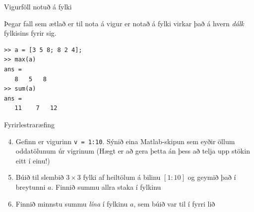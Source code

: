 \documentclass[handout]{beamer}
\begin{document}
\begin{frame}[fragile]{Vigurföll notuð á fylki}

Þegar fall sem ætlað er til nota á vigur er notað á fylki virkar það á hvern \emph{dálk} fylkisins fyrir sig.

\begin{verbatim}
>> a = [3 5 8; 8 2 4];
>> max(a)
ans =
   8   5   8
>> sum(a)
ans =
   11    7   12
\end{verbatim}
\end{frame}

\begin{frame}{Fyrirlestraræfing}
\begin{enumerate}
\setcounter{enumi}{3}
 \item Gefinn er vigurinn \texttt{v = 1:10}. Sýnið eina Matlab-skipun sem eyðir öllum oddatölunum úr vigrinum (Hægt er að gera þetta án þess að telja upp stökin eitt í einu!)
 \item Búið til slembið $3 \times 3$ fylki af heiltölum á bilinu $[1:10]$ og geymið það í breytunni $a$. Finnið summu allra staka í fylkinu
 \item Finnið minnstu summu \emph{lína} í fylkinu $a$, sem búið var til í fyrri lið
\end{enumerate}
\end{frame}
\end{document}
